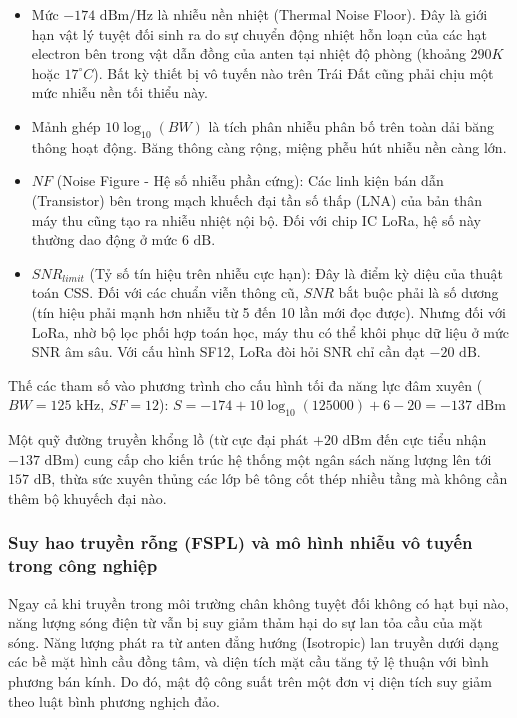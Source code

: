 \begin{itemize}
    \item Mức $-174 \text{ dBm/Hz}$ là nhiễu nền nhiệt (Thermal Noise Floor). Đây là giới hạn vật lý tuyệt đối sinh ra do sự chuyển động nhiệt hỗn loạn của các hạt electron bên trong vật dẫn đồng của anten tại nhiệt độ phòng (khoảng $290K$ hoặc $17^\circ C$). Bất kỳ thiết bị vô tuyến nào trên Trái Đất cũng phải chịu một mức nhiễu nền tối thiểu này.
    \item Mảnh ghép $10 \log_{10}(BW)$ là tích phân nhiễu phân bố trên toàn dải băng thông hoạt động. Băng thông càng rộng, miệng phễu hút nhiễu nền càng lớn.
    \item $NF$ (Noise Figure - Hệ số nhiễu phần cứng): Các linh kiện bán dẫn (Transistor) bên trong mạch khuếch đại tần số thấp (LNA) của bản thân máy thu cũng tạo ra nhiễu nhiệt nội bộ. Đối với chip IC LoRa, hệ số này thường dao động ở mức $6 \text{ dB}$.
    \item $SNR_{limit}$ (Tỷ số tín hiệu trên nhiễu cực hạn): Đây là điểm kỳ diệu của thuật toán CSS. Đối với các chuẩn viễn thông cũ, $SNR$ bắt buộc phải là số dương (tín hiệu phải mạnh hơn nhiễu từ 5 đến 10 lần mới đọc được). Nhưng đối với LoRa, nhờ bộ lọc phối hợp toán học, máy thu có thể khôi phục dữ liệu ở mức SNR âm sâu. Với cấu hình SF12, LoRa đòi hỏi SNR chỉ cần đạt $-20 \text{ dB}$.
\end{itemize}
Thế các tham số vào phương trình cho cấu hình tối đa năng lực đâm xuyên ($BW = 125 \text{ kHz}$, $SF = 12$): $S = -174 + 10 \log_{10}(125000) + 6 - 20 = -137 \text{ dBm}$

Một quỹ đường truyền khổng lồ (từ cực đại phát $+20 \text{ dBm}$ đến cực tiểu nhận $-137 \text{ dBm}$) cung cấp cho kiến trúc hệ thống một ngân sách năng lượng lên tới $157 \text{ dB}$, thừa sức xuyên thủng các lớp bê tông cốt thép nhiều tầng mà không cần thêm bộ khuyếch đại nào.
\subsubsection{Suy hao truyền rỗng (FSPL) và mô hình nhiễu vô tuyến trong công nghiệp \cite{rappaport2002wireless}}
Ngay cả khi truyền trong môi trường chân không tuyệt đối không có hạt bụi nào, năng lượng sóng điện từ vẫn bị suy giảm thảm hại do sự lan tỏa cầu của mặt sóng. Năng lượng phát ra từ anten đẳng hướng (Isotropic) lan truyền dưới dạng các bề mặt hình cầu đồng tâm, và diện tích mặt cầu tăng tỷ lệ thuận với bình phương bán kính. Do đó, mật độ công suất trên một đơn vị diện tích suy giảm theo luật bình phương nghịch đảo.

